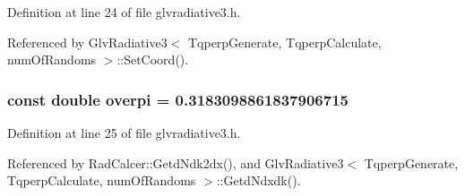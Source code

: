 Definition at line 24 of file glvradiative3.h.

Referenced by GlvRadiative3$<$ TqperpGenerate, TqperpCalculate, numOfRandoms $>$::SetCoord().
\subsubsection{\setlength{\rightskip}{0pt plus 5cm}const double {\bf overpi} = 0.3183098861837906715\hspace{0.3cm}{\tt  [static]}}\label{glvradiative3_8h_587fa85cc7ff0281ea1864c928c36cd5}




Definition at line 25 of file glvradiative3.h.

Referenced by RadCalcer::GetdNdk2dx(), and GlvRadiative3$<$ TqperpGenerate, TqperpCalculate, numOfRandoms $>$::GetdNdxdk().